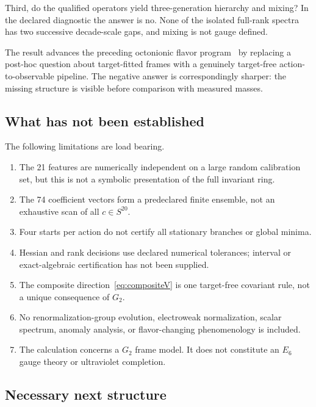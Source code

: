 \documentclass[11pt]{article}
\begin{document}
Third, do the qualified operators yield three-generation hierarchy and mixing?  In the declared diagnostic the answer is no.  None of the isolated full-rank spectra has two successive decade-scale gaps, and mixing is not gauge defined.

The result advances the preceding octonionic flavor program~\cite{ConnellyGeometry2026} by replacing a post-hoc question about target-fitted frames with a genuinely target-free action-to-observable pipeline.  The negative answer is correspondingly sharper: the missing structure is visible before comparison with measured masses.

\subsection{What has not been established}

The following limitations are load bearing.
\begin{enumerate}[label=(\roman*)]
  \item The 21 features are numerically independent on a large random calibration set, but this is not a symbolic presentation of the full invariant ring.
  \item The 74 coefficient vectors form a predeclared finite ensemble, not an exhaustive scan of all $c\in S^{20}$.
  \item Four starts per action do not certify all stationary branches or global minima.
  \item Hessian and rank decisions use declared numerical tolerances; interval or exact-algebraic certification has not been supplied.
  \item The composite direction~\eqref{eq:compositeV} is one target-free covariant rule, not a unique consequence of $G_2$.
  \item No renormalization-group evolution, electroweak normalization, scalar spectrum, anomaly analysis, or flavor-changing phenomenology is included.
  \item The calculation concerns a $G_2$ frame model.  It does not constitute an $E_6$ gauge theory or ultraviolet completion.
\end{enumerate}

\subsection{Necessary next structure}
\end{document}
